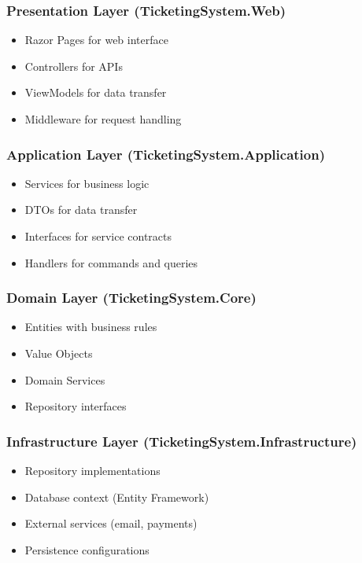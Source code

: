 \documentclass[12pt,a4paper]{article}
\begin{document}
\subsubsection{Presentation Layer (TicketingSystem.Web)}
\begin{itemize}
    \item Razor Pages for web interface
    \item Controllers for APIs
    \item ViewModels for data transfer
    \item Middleware for request handling
\end{itemize}

\subsubsection{Application Layer (TicketingSystem.Application)}
\begin{itemize}
    \item Services for business logic
    \item DTOs for data transfer
    \item Interfaces for service contracts
    \item Handlers for commands and queries
\end{itemize}

\subsubsection{Domain Layer (TicketingSystem.Core)}
\begin{itemize}
    \item Entities with business rules
    \item Value Objects
    \item Domain Services
    \item Repository interfaces
\end{itemize}

\subsubsection{Infrastructure Layer (TicketingSystem.Infrastructure)}
\begin{itemize}
    \item Repository implementations
    \item Database context (Entity Framework)
    \item External services (email, payments)
    \item Persistence configurations
\end{itemize}
\end{document}
